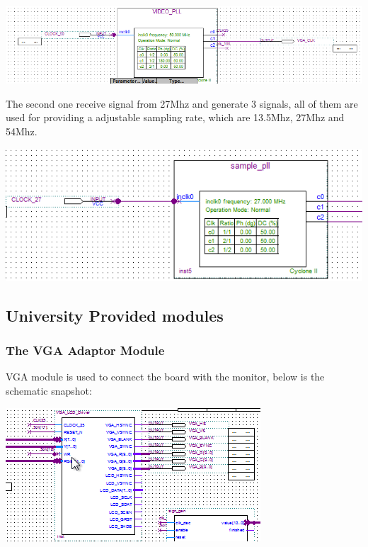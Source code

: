 \documentclass[11pt]{scrartcl}
\begin{document}
\begin{minipage}[t]{\linewidth}

{
\includegraphics[scale = 0.5]{pll1.png}
}
\end{minipage}
\medskip

The second one receive signal from 27Mhz and generate 3 signals, all of them are used for providing a adjustable sampling rate, which are 13.5Mhz, 27Mhz and 54Mhz. 

\begin{minipage}[t]{\linewidth}

{
\includegraphics[scale = 0.5]{pll2.png}
}
\end{minipage}
\medskip

\subsection{University Provided modules}
\subsubsection{The VGA Adaptor Module}
\label{sec:vga}
VGA module is used to connect the board with the monitor, below is the schematic snapshot:

\begin{minipage}[t]{\linewidth}

{
\includegraphics[scale = 1]{vga.png}
}
\end{minipage}
\medskip
\end{document}
